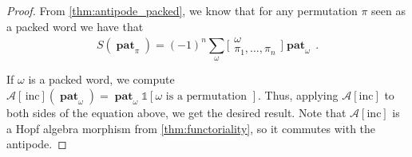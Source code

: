 \documentclass[12pt, reqno]{amsart}
\theoremstyle{definition}
\newtheorem{defin}[thm]{Definition}
\DeclareMathOperator{\pat}{\mathbf{pat}}
\begin{document}
\begin{proof}
From \cref{thm:antipode_packed}, we know that for any permutation $\pi$ seen as a packed word we have that
$$S(\pat_{\pi}) = (-1)^n \sum_{\omega} \bigl[\!\begin{smallmatrix} \omega \\ \pi_1, \dots, \pi_n \end{smallmatrix}\!\bigr] \pat_{\omega}\, . $$

If $\omega$ is a packed word, we compute $\mathcal A[\,\mathrm{inc}] (\pat_{\omega}) = \pat_{\omega}\mathbb{1}[\omega \text{ is a permutation }]$.
Thus, applying $\mathcal A[\mathrm{inc}]$ to both sides of the equation above, we get the desired result.
Note that $\mathcal A[\mathrm{inc}]$ is a Hopf algebra morphism from \cref{thm:functoriality}, so it commutes with the antipode.
\end{proof}
%
%
%
%
%
%
\end{document}

